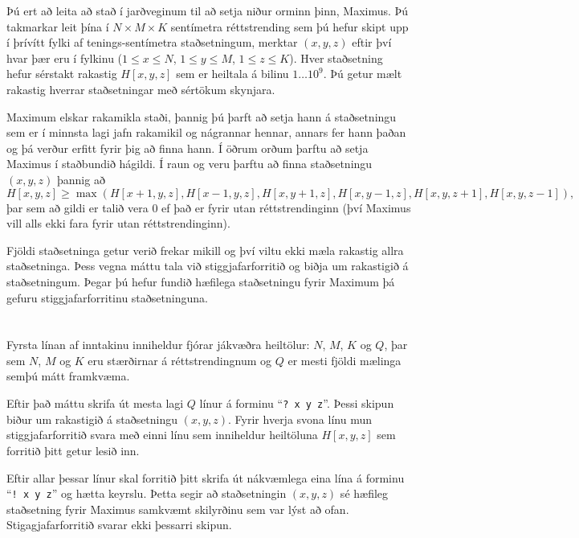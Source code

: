 \ifx\boi\undefined\fi
\def\version{jury-1}

Þú ert að leita að stað í jarðveginum til að setja niður orminn þinn, Maximus. Þú takmarkar leit þína
í $N \times M \times K$ sentímetra réttstrending sem þú hefur skipt upp í þrívítt fylki af 
tenings-sentímetra staðsetningum, merktar $(x,y,z)$ eftir því hvar þær eru í fylkinu 
($1 \le x \le N$, $1 \le y \le M$, $1 \le z \le K$). Hver staðsetning hefur sérstakt rakastig 
$H[x,y,z]$ sem er heiltala á bilinu $1 \dots 10^9$. Þú getur mælt rakastig hverrar staðsetningar
með sértökum skynjara.

Maximum elskar rakamikla staði, þannig þú þarft að setja hann á staðsetningu sem er í minnsta
lagi jafn rakamikil og nágrannar hennar, annars fer hann þaðan og þá verður erfitt fyrir þig
að finna hann. Í öðrum orðum þarftu að setja Maximus í staðbundið hágildi.
Í raun og veru þarftu að finna staðsetningu $(x,y,z)$ þannig að
$$
H[x,y,z] \ge \max(H[x+1,y,z], H[x-1,y,z], H[x,y+1,z], H[x,y-1,z], H[x,y,z+1], H[x,y,z-1]),
$$
þar sem að gildi er talið vera $0$ ef það er fyrir utan réttstrendinginn (því Maximus vill 
alls ekki fara fyrir utan réttstrendinginn).

Fjöldi staðsetninga getur verið frekar mikill og því viltu ekki mæla rakastig allra staðsetninga.
Þess vegna máttu tala við stiggjafarforritið og biðja um rakastigið á staðsetningum.
Þegar þú hefur fundið hæfilega staðsetningu fyrir Maximum þá gefuru stiggjafarforritinu staðsetninguna.

\section*{\interactivity}
Fyrsta línan af inntakinu inniheldur fjórar jákvæðra heiltölur: $N$, $M$, $K$ og $Q$, þar sem $N$, $M$ og $K$ eru stærðirnar á réttstrendingnum og $Q$ er mesti fjöldi mælinga semþú mátt framkvæma.

Eftir það máttu skrifa út mesta lagi $Q$ línur á forminu ``\texttt{?\ x y z}''.
Þessi skipun biður um rakastigið á staðsetningu $(x, y, z)$.
Fyrir hverja svona línu mun stiggjafarforritið svara með einni línu sem inniheldur heiltöluna $H[x,y,z]$ sem forritið þitt getur lesið inn.

Eftir allar þessar línur skal forritið þitt skrifa út nákvæmlega eina lína á forminu ``\texttt{!\ x y z}'' og hætta keyrslu.
Þetta segir að staðsetningin $(x, y, z)$ sé hæfileg staðsetning fyrir Maximus samkvæmt skilyrðinu sem var lýst að ofan.
Stigagjafarforritið svarar ekki þessarri skipun.

